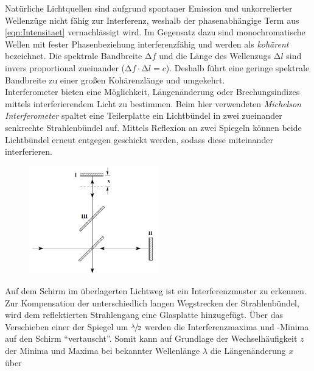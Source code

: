 \noindent Natürliche Lichtquellen sind aufgrund spontaner Emission und unkorrelierter Wellenzüge nicht fähig zur Interferenz, weshalb der 
phasenabhängige Term aus \eqref{eqn:Intensitaet} vernachlässigt wird. Im Gegensatz dazu sind monochromatische Wellen mit fester 
Phasenbeziehung interferenzfähig und werden als \emph{kohärent} bezeichnet. Die spektrale Bandbreite $\increment{}f$ und die Länge des 
Wellenzugs $\increment{}l$ sind invers proportional zueinander ($\increment{}f\cdot\increment{}l = c$). Deshalb führt eine geringe 
spektrale Bandbreite zu einer großen Kohärenzlänge und umgekehrt.\\
    Interferometer bieten eine Möglichkeit, Längenänderung oder Brechungsindizes mittels interferierendem Licht zu bestimmen.
    Beim hier verwendeten \emph{Michelson Interferometer} spaltet eine Teilerplatte ein Lichtbündel in zwei zueinander senkrechte 
    Strahlenbündel auf. Mittels Reflexion an zwei Spiegeln können beide Lichtbündel erneut entgegen geschickt werden, sodass diese miteinander 
    interferieren.
%
%
\begin{figure}
    \vspace{-20pt}
    \begin{center}
        \includegraphics[width=0.5\textwidth]{Michelson_Interferom.png}
    \end{center}
\end{figure}

\noindent Auf dem Schirm im überlagerten Lichtweg ist ein Interferenzmuster zu erkennen. Zur Kompensation der unterschiedlich langen 
Wegstrecken der Strahlenbündel, wird dem reflektierten Strahlengang eine Glasplatte hinzugefügt. Über das Verschieben einer der 
Spiegel um $\sfrac{\lambda}{2}$ werden die Interferenzmaxima und -Minima auf den Schirm \enquote{vertauscht}. Somit kann auf Grundlage 
der Wechselhäufigkeit $z$ der Minima und Maxima bei bekannter Wellenlänge $\lambda$ die Längenänderung $x$ über 

